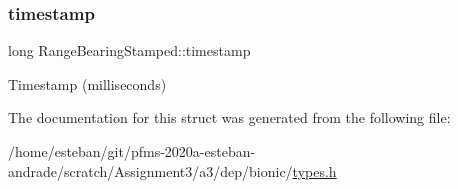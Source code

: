 \subsubsection{\texorpdfstring{timestamp}{timestamp}}
{\footnotesize\ttfamily long Range\+Bearing\+Stamped\+::timestamp}

Timestamp (milliseconds) 

The documentation for this struct was generated from the following file\+:\begin{DoxyCompactItemize}
\item 
/home/esteban/git/pfms-\/2020a-\/esteban-\/andrade/scratch/\+Assignment3/a3/dep/bionic/\hyperlink{bionic_2types_8h}{types.\+h}\end{DoxyCompactItemize}
